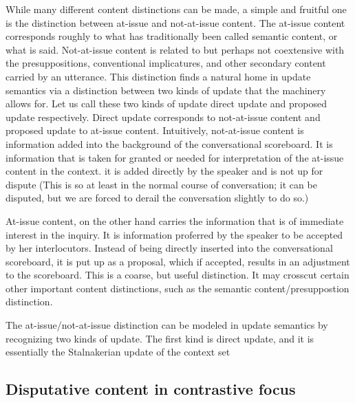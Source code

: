 \documentclass[letterpaper,10pt]{article}
\begin{document}
While many different content distinctions can be made, a simple and fruitful one is the distinction between at-issue and not-at-issue content.  The at-issue content corresponds roughly to what has traditionally been called semantic content, or what is said.  Not-at-issue content is related to but perhaps not coextensive with the presuppositions, conventional implicatures, and other secondary content carried by an utterance. This distinction finds a natural home in update semantics via a distinction between two kinds of update that the machinery allows for.  Let us call these two kinds of update direct update and proposed update respectively.  Direct update corresponds to not-at-issue content and proposed update to at-issue content.  Intuitively, not-at-issue content is information added into the background of the conversational scoreboard.  It is information that is taken for granted or needed for interpretation of the at-issue content in the context.  it is added directly by the speaker and is not up for dispute (This is so at least in the normal course of conversation; it can be disputed, but we are forced to derail the conversation slightly to do so.)

At-issue content, on the other hand carries the information that is of immediate interest in the inquiry.  It is information proferred by the speaker to be accepted by her interlocutors.  Instead of being directly inserted into the conversational scoreboard, it is put up as a proposal, which if accepted, results in an adjustment to the scoreboard.  This is a coarse, but useful distinction.  It may crosscut certain other important content distinctions, such as the semantic content/presuppostion distinction.

The at-issue/not-at-issue distinction can be modeled in update semantics by recognizing two kinds of update.  The first kind is direct update, and it is essentially the Stalnakerian update of the context set
\subsection{Disputative content in contrastive focus}
\end{document}
